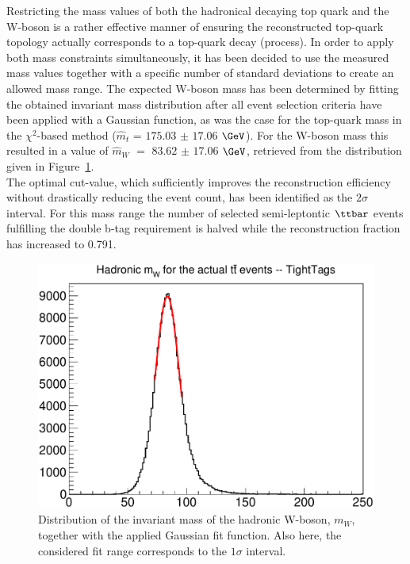 Restricting the mass values of both the hadronical decaying top quark and the W-boson is a rather effective manner of ensuring the reconstructed top-quark topology actually corresponds to a top-quark decay (process).
In order to apply both mass constraints simultaneously, it has been decided to use the measured mass values together with a specific number of standard deviations to create an allowed mass range.
The expected W-boson mass has been determined by fitting the obtained invariant mass distribution after all event selection criteria have been applied with a Gaussian function, as was the case for the top-quark mass in the $\chi^{2}$-based method ($\hat{m}_{t}$ = $175.03$ $\pm$ $17.06$ $\GeV$). For the W-boson mass this resulted in a value of $\hat{m}_{W}$ $=$ $83.62$ $\pm$ $17.06$ $\GeV$, retrieved from the distribution given in Figure~\ref{fig::InvWMass}.
\\
The optimal cut-value, which sufficiently improves the reconstruction efficiency without drastically reducing the event count, has been identified as the $2\sigma$ interval. For this mass range the number of selected semi-leptontic $\ttbar$ events fulfilling the double b-tag requirement is halved while the reconstruction fraction has increased to 0.791.
\begin{figure}[h!t]
 \centering
 \includegraphics[width = 0.7 \textwidth]{Chapters/Chapter4_EvtSel/Figures/HadrMWMassDistr.pdf}  %
 \caption{Distribution of the invariant mass of the hadronic W-boson, $m_{W}$, together with the applied Gaussian fit function. Also here, the considered fit range corresponds to the $1\sigma$ interval.} \label{fig::InvWMass}
\end{figure}

